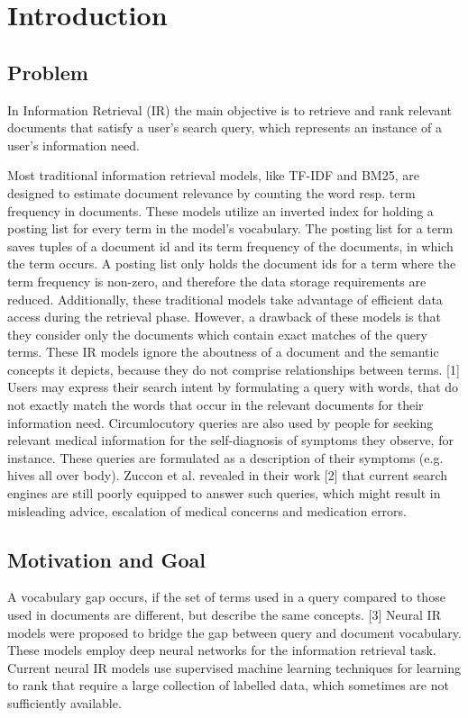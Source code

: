 \chapter{Introduction}

\section{Problem}

In Information Retrieval (IR) the main objective is to retrieve and rank relevant documents that satisfy a user’s search query, which represents an instance of a user’s information need.

Most traditional information retrieval models, like TF-IDF and BM25, are designed to estimate document relevance by counting the word resp. term frequency in documents.
These models utilize an inverted index for holding a posting list for every term in the model’s vocabulary.
The posting list for a term saves tuples of a document id and its term frequency of the documents, in which the term occurs.
A posting list only holds the document ids for a term where the term frequency is non-zero, and therefore the data storage requirements are reduced.
Additionally, these traditional models take advantage of efficient data access during the retrieval phase.
However, a drawback of these models is that they consider only the documents which contain exact matches of the query terms.
These IR models ignore the aboutness of a document and the semantic concepts it depicts, because they do not comprise relationships between terms. [1]
Users may express their search intent by formulating a query with words, that do not exactly match the words that occur in the relevant documents for their information need.
Circumlocutory queries are also used by people for seeking relevant medical information for the self-diagnosis of symptoms they observe, for instance.
These queries are formulated as a description of their symptoms (e.g. hives all over body). 
Zuccon et al. revealed in their work [2] that current search engines are still poorly equipped to answer such queries, which might result in misleading advice, escalation of medical concerns and medication errors.


\section{Motivation and Goal}

A vocabulary gap occurs, if the set of terms used in a query compared to those used in documents are different, but describe the same concepts. [3]
Neural IR models were proposed to bridge the gap between query and document vocabulary.
These models employ deep neural networks for the information retrieval task.
Current neural IR models use supervised machine learning techniques for learning to rank that require a large collection of labelled data, which sometimes are not sufficiently available.

